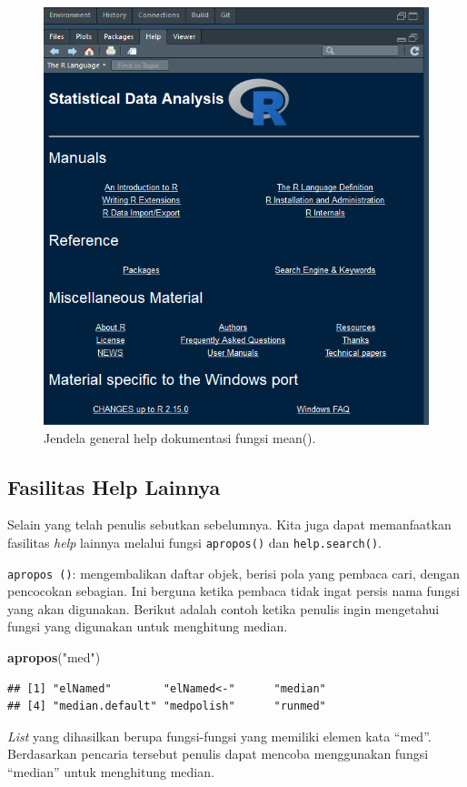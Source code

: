 \documentclass[
]{book}
\newenvironment{Shaded}{\begin{snugshade}}{\end{snugshade}}
\newcommand{\FunctionTok}[1]{\textcolor[rgb]{0.13,0.29,0.53}{\textbf{#1}}}
\newcommand{\NormalTok}[1]{#1}
\newcommand{\StringTok}[1]{\textcolor[rgb]{0.31,0.60,0.02}{#1}}
\theoremstyle{definition}
\theoremstyle{definition}
\theoremstyle{definition}
\theoremstyle{definition}
\theoremstyle{remark}
\begin{document}
\begin{figure}

{\centering \includegraphics[width=0.5\linewidth]{./images/generalhelp} 

}

\caption{Jendela general help dokumentasi fungsi mean().}\label{fig:generalhelp}
\end{figure}

\hypertarget{othershelp}{%
\subsection{Fasilitas Help Lainnya}\label{othershelp}}

Selain yang telah penulis sebutkan sebelumnya. Kita juga dapat memanfaatkan fasilitas \emph{help} lainnya melalui fungsi \texttt{apropos()} dan \texttt{help.search()}.

\texttt{apropos\ ()}: mengembalikan daftar objek, berisi pola yang pembaca cari, dengan pencocokan sebagian. Ini berguna ketika pembaca tidak ingat persis nama fungsi yang akan digunakan. Berikut adalah contoh ketika penulis ingin mengetahui fungsi yang digunakan untuk menghitung median.

\begin{Shaded}
\begin{Highlighting}[]
\FunctionTok{apropos}\NormalTok{(}\StringTok{"med"}\NormalTok{)}
\end{Highlighting}
\end{Shaded}

\begin{verbatim}
## [1] "elNamed"        "elNamed<-"      "median"        
## [4] "median.default" "medpolish"      "runmed"
\end{verbatim}

\emph{List} yang dihasilkan berupa fungsi-fungsi yang memiliki elemen kata ``med''. Berdasarkan pencaria tersebut penulis dapat mencoba menggunakan fungsi ``median'' untuk menghitung median.
\end{document}
